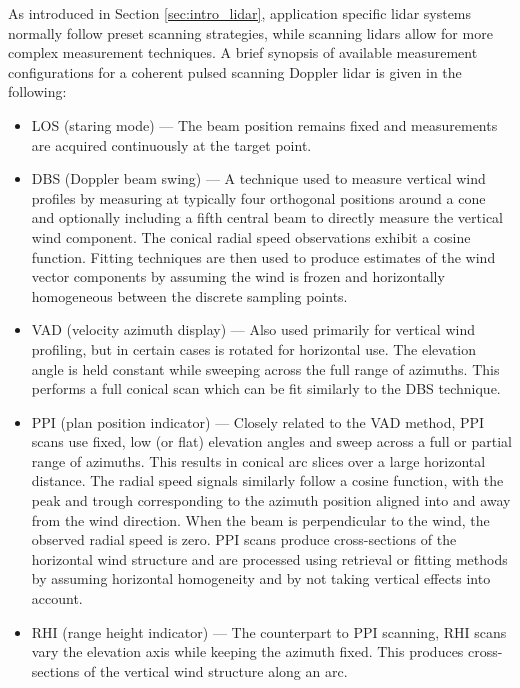 As introduced in Section \ref{sec:intro_lidar}, application specific lidar systems normally follow preset scanning strategies, while scanning lidars allow for more complex measurement techniques. A brief synopsis of available measurement configurations for a coherent pulsed scanning Doppler lidar is given in the following: 

\begin{itemize}
\item LOS (staring mode) --- The beam position remains fixed and measurements are acquired continuously at the target point.

\item DBS (Doppler beam swing) --- A technique used to measure vertical wind profiles by measuring at typically four orthogonal positions around a cone and optionally including a fifth central beam to directly measure the vertical wind component. The conical radial speed observations exhibit a cosine function. Fitting techniques are then used to produce estimates of the wind vector components by assuming the wind is frozen and horizontally homogeneous between the discrete sampling points.

\item VAD (velocity azimuth display) --- Also used primarily for vertical wind profiling, but in certain cases is rotated for horizontal use. The elevation angle is held constant while sweeping across the full range of azimuths. This performs a full conical scan which can be fit similarly to the DBS technique.

\item PPI (plan position indicator) --- Closely related to the VAD method, PPI scans use fixed, low (or flat) elevation angles and sweep across a full or partial range of azimuths. This results in conical arc slices over a large horizontal distance. The radial speed signals similarly follow a cosine function, with the peak and trough corresponding to the azimuth position aligned into and away from the wind direction. When the beam is perpendicular to the wind, the observed radial speed is zero. PPI scans produce cross-sections of the horizontal wind structure and are processed using retrieval or fitting methods by assuming horizontal homogeneity and by not taking vertical effects into account.

\item RHI (range height indicator) --- The counterpart to PPI scanning, RHI scans vary the elevation axis while keeping the azimuth fixed. This produces cross-sections of the vertical wind structure along an arc.


\end{itemize}
